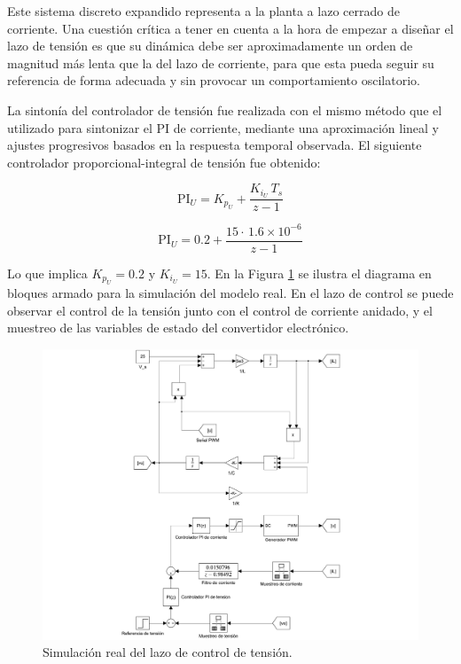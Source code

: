Este sistema discreto expandido representa a la planta a lazo cerrado de corriente. Una cuestión crítica a tener en cuenta a la hora de empezar a diseñar el lazo de tensión es que su dinámica debe ser aproximadamente un orden de magnitud más lenta que la del lazo de corriente, para que esta pueda seguir su referencia de forma adecuada y sin provocar un comportamiento oscilatorio.

La sintonía del controlador de tensión fue realizada con el mismo método que el utilizado para sintonizar el PI de corriente, mediante una aproximación lineal y ajustes progresivos basados en la respuesta temporal observada. El siguiente controlador proporcional-integral de tensión fue obtenido:

\begin{equation*}
  \mathrm{PI}_U = K_{p_U} + \frac{K_{i_U} \, T_s}{z-1} 
\end{equation*}

\begin{equation*}
  \boxed{\mathrm{PI}_U = 0.2 + \frac{15 \cdot \, 1.6 \times 10^{-6}}{z-1}}
\end{equation*}

Lo que implica $K_{p_U} = 0.2$ y $K_{i_U} = 15$. En la Figura \ref{simulacion-modelo-real-tension} se ilustra el diagrama en bloques armado para la simulación del modelo real. En el lazo de control se puede observar el control de la tensión junto con el control de corriente anidado, y el muestreo de las variables de estado del convertidor electrónico. 

\begin{figure}[hbt!]
  \centering
  \includegraphics[width=0.75\columnwidth]{Imágenes/Diseño del control/Simulación del lazo de tensión/Simulación real del lazo de tensión.pdf}
  \caption{Simulación real del lazo de control de tensión.}
  \label{simulacion-modelo-real-tension}
\end{figure} 

